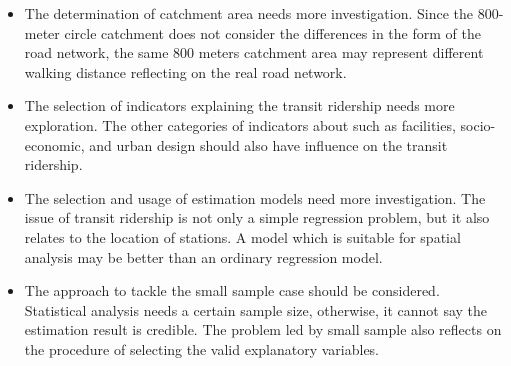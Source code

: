 %
\begin{itemize}
	\item The determination of catchment area needs more investigation. Since the 800-meter circle catchment does not consider the differences in the form of the road network, the same 800 meters catchment area may represent different walking distance reflecting on the real road network.
	
	\item The selection of indicators explaining the transit ridership needs more exploration. The other categories of indicators about such as facilities, socio-economic, and urban design should also have influence on the transit ridership.
	
	\item The selection and usage of estimation models need more investigation. The issue of transit ridership is not only a simple regression problem, but it also relates to the location of stations. A model which is suitable for spatial analysis may be better than an ordinary regression model. 
	
	\item The approach to tackle the small sample case should be considered. Statistical analysis needs a certain sample size, otherwise, it cannot say the estimation result is credible. The problem led by small sample also reflects on the procedure of selecting the valid explanatory variables. 
\end{itemize}


\clearpage %

% 
